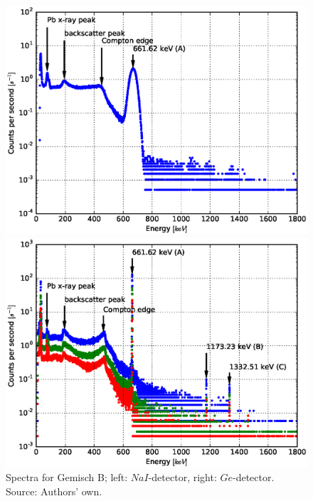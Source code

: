 \documentclass[a4paper]{article}
\begin{document}
\begin{figure}[H]
	\begin{minipage}[t]{0.5\textwidth}
		\begin{center}
		\includegraphics[width=1.0\textwidth]{plots/gemisch_b.eps}
		\end{center}
	\end{minipage}
	\begin{minipage}[t]{0.5\textwidth}
		\begin{center}
		\includegraphics[width=1.0\textwidth]{plots/gemisch_b_ged.eps}
		\end{center}
	\end{minipage}
	\caption{Spectra for Gemisch B; left: $NaI$-detector, right: $Ge$-detector. Source: Authors' own.}
	\label{fig:gemisch_b}
\end{figure}
\end{document}
